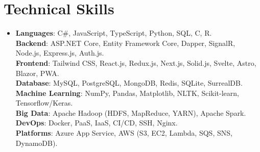 \documentclass[12pt,a4paper]{article}
\begin{document}
\section{Technical Skills}
 \begin{itemize}[leftmargin=0in, label={}]
    \item{
     \textbf{Languages}{: C\#, JavaScript, TypeScript, Python, SQL, C, R.} \\
     \textbf{Backend}{: ASP.NET Core, Entity Framework Core, Dapper, SignalR, Node.js, Express.js, Auth.js.} \\
     \textbf{Frontend}{: Tailwind CSS, React.js, Redux.js, Next.js, Solid.js, Svelte, Astro, Blazor, PWA.} \\
     \textbf{Database}{: MySQL, PostgreSQL, MongoDB, Redis, SQLite, SurrealDB.} \\
     \textbf{Machine Learning}{: NumPy, Pandas, Matplotlib, NLTK, Scikit-learn, Tensorflow/Keras.} \\
     \textbf{Big Data}{: Apache Hadoop (HDFS, MapReduce, YARN), Apache Spark.} \\
     \textbf{DevOps}{: Docker, PaaS, IaaS, CI/CD, SSH, Nginx.} \\
     \textbf{Platforms}{: Azure App Service, AWS (S3, EC2, Lambda, SQS, SNS, DynamoDB).} \\
    }
 \end{itemize}
 \vspace{-16pt}

\end{document}
